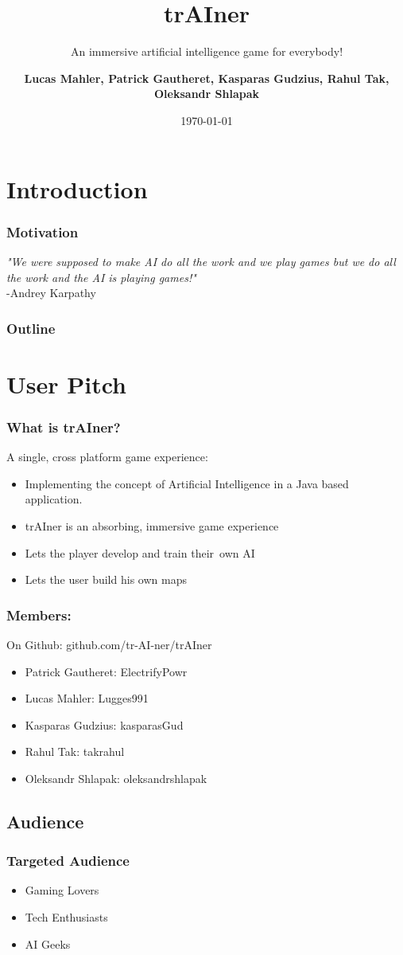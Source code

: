 \documentclass{beamer}
\title{trAIner}
\subtitle{An immersive artificial intelligence game for everybody!}
\author{\textbf{Lucas Mahler, Patrick Gautheret, Kasparas Gudzius, Rahul Tak, Oleksandr Shlapak}}
\institute{University of Applied Sciences Ulm}
\date{\today}
\begin{document}
\begin{frame}
\titlepage
\end{frame}
\section{Introduction}
\begin{frame}
    \frametitle{Motivation}
    \large
    \textit{"We were supposed to make AI do all the work and we play games but we do all the work and the AI is playing games!"}\newline\\
    -Andrey Karpathy
\end{frame}
\begin{frame}
    \frametitle{Outline}
    \tableofcontents
\end{frame}
\section{User Pitch}
\begin{frame}
    \frametitle{What is trAIner?}
    A single, cross platform game experience:
    \begin{itemize}
        \item Implementing the concept of Artificial Intelligence in a Java based application.
        \item trAIner is an absorbing, immersive game experience
        \item Lets the player develop and train their own AI 
        \item Lets the user build his own maps
    \end{itemize}

\end{frame}
\begin{frame}
    \frametitle{Members:}
    On Github: github.com/tr-AI-ner/trAIner
\begin{itemize}
        \item Patrick Gautheret: ElectrifyPowr
        \item Lucas Mahler: Lugges991
        \item Kasparas Gudzius: kasparasGud
        \item Rahul Tak: takrahul
        \item Oleksandr Shlapak: oleksandrshlapak
    \end{itemize}

\end{frame}

\subsection{Audience}
\begin{frame}
    \frametitle{Targeted Audience}
    \begin{itemize}
        \item Gaming Lovers
        \item Tech Enthusiasts
        \item AI Geeks
    \end{itemize}
\end{frame}
\end{document}
